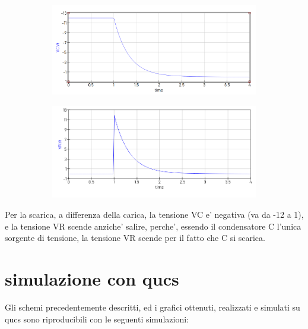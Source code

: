 \documentclass[12pt]{article}
\begin{document}
\begin{figure}[h!]
  \centering
  \begin{subfigure}[b]{0.49\linewidth}
    \includegraphics[width=\linewidth]{data/scarica-VC.png}
  \end{subfigure}
  \begin{subfigure}[b]{0.49\linewidth}
    \includegraphics[width=\linewidth]{data/scarica-VR.png}
  \end{subfigure}
\end{figure}

Per la scarica, a differenza della carica, la tensione VC e' negativa (va da -12 a 1), e la tensione VR scende anziche' salire, perche', essendo il condensatore C l'unica sorgente di tensione, la tensione VR scende per il fatto che C si scarica.

\newpage

\section*{simulazione con qucs}
Gli schemi precedentemente descritti, ed i grafici ottenuti, realizzati e simulati su qucs sono riproducibili con le seguenti simulazioni:  
\end{document}
